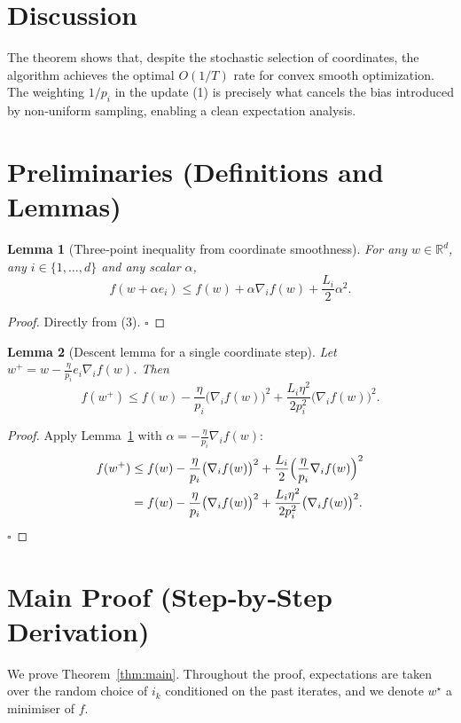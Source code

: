 \documentclass{article}
\newtheorem{lemma}{Lemma}
\newcommand{\R}{\mathbb{R}}
\begin{document}
\section*{Discussion}
The theorem shows that, despite the stochastic selection of coordinates,
the algorithm achieves the optimal $O(1/T)$ rate for convex smooth
optimization. The weighting $1/p_i$ in the update (1) is precisely what
cancels the bias introduced by non‑uniform sampling, enabling a clean
expectation analysis.

\newpage
\section*{Preliminaries (Definitions and Lemmas)}
\begin{lemma}[Three‑point inequality from coordinate smoothness]
\label{lem:three}
For any $w\in\R^{d}$, any $i\in\{1,\dots ,d\}$ and any scalar $\alpha$,
\[
f(w+\alpha e_i)\le f(w)+\alpha \nabla_i f(w)+\frac{L_i}{2}\alpha^{2}.
\]
\end{lemma}
\begin{proof}
Directly from (3). \hfill $\square$
\end{proof}

\begin{lemma}[Descent lemma for a single coordinate step]
\label{lem:descent}
Let $w^{+}=w-\frac{\eta}{p_i}e_i\nabla_i f(w)$. Then
\[
f(w^{+})\le f(w)-\frac{\eta}{p_i}\bigl(\nabla_i f(w)\bigr)^{2}
+\frac{L_i\eta^{2}}{2p_i^{2}}\bigl(\nabla_i f(w)\bigr)^{2}.
\tag{6}
\]
\end{lemma}
\begin{proof}
Apply Lemma~\ref{lem:three} with $\alpha=-\frac{\eta}{p_i}\nabla_i f(w)$:
\[
\begin{aligned}
f(w^{+})
&\le f(w)-\frac{\eta}{p_i}\bigl(\nabla_i f(w)\bigr)^{2}
    +\frac{L_i}{2}\Bigl(\frac{\eta}{p_i}\nabla_i f(w)\Bigr)^{2}\\
&= f(w)-\frac{\eta}{p_i}\bigl(\nabla_i f(w)\bigr)^{2}
   +\frac{L_i\eta^{2}}{2p_i^{2}}\bigl(\nabla_i f(w)\bigr)^{2}.
\end{aligned}
\]
\hfill $\square$
\end{proof}

\section*{Main Proof (Step‑by‑Step Derivation)}
We prove Theorem~\ref{thm:main}.  Throughout the proof,
expectations are taken over the random choice of $i_k$ conditioned on
the past iterates, and we denote $w^{\star}$ a minimiser of $f$.
\end{document}
